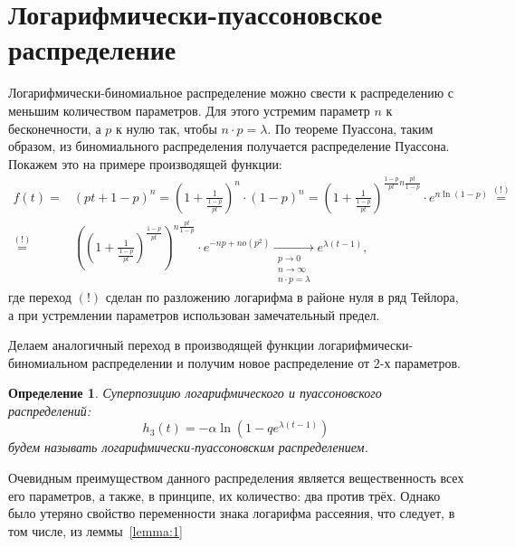 \documentclass[12pt, specialist, subf, substylefile = spbu_report.rtx]{disser}
\newtheorem{define}{Определение}
\begin{document}
	\section{Логарифмически-пуассоновское распределение}
	
	Логарифмически-биномиальное распределение можно свести к распределению с меньшим количеством параметров. Для этого устремим параметр $n$ к бесконечности, а $p$ к нулю так, чтобы $n \cdot p = \lambda$. По теореме Пуассона, таким образом, из биномиального распределения получается распределение Пуассона. Покажем это на примере производящей функции: 
	\[
		\begin{aligned}
			f (t) =& (p t + 1 - p) ^n = \left(1 + \frac {1}{\frac{1 - p} {pt}}\right) ^n \cdot (1 - p) ^n = \left(1 + \frac {1}{\frac{1 - p} {pt}}\right) ^{\frac{1 - p} {pt} n \frac {pt} {1 - p}} \cdot e ^{n \ln(1 - p)} \stackrel{(!)}{=}\\
			\stackrel{(!)}{=}& \left(\left(1 + \frac {1}{\frac{1 - p} {pt}}\right) ^{\frac{1 - p} {pt}}\right) ^ {n \frac {pt} {1 - p}} \cdot e ^{-np + no(p ^2)} \xrightarrow[\substack{p \to 0\\n \to \infty\\n \cdot p = \lambda}]{} e ^{\lambda (t - 1)},
		\end{aligned}
	\]
	где переход $(!)$ сделан по разложению логарифма в районе нуля в ряд Тейлора, а при устремлении параметров использован замечательный предел.
	
	Делаем аналогичный переход в производящей функции логарифмически-биномиальном распределении и получим новое распределение от $2$-х параметров.
	
	\begin{define}
		Суперпозицию логарифмического и пуассоновского распределений:
		\[
		h _3 (t) = -\alpha \ln (1 - q e ^{\lambda (t - 1)})
		\]
		будем называть логарифмически-пуассоновским распределением.
		\label{def:4}
	\end{define}

	Очевидным преимуществом данного распределения является вещественность всех его параметров, а также, в принципе, их количество: два против трёх. Однако было утеряно свойство переменности знака логарифма рассеяния, что следует, в том числе, из леммы~\ref{lemma:1}
	
\end{document}
